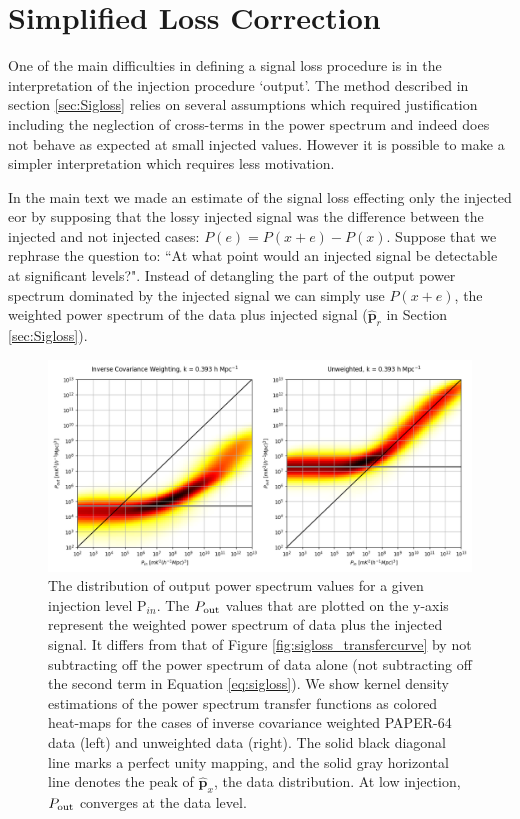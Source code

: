 \documentclass[preprint2,numberedappendix,tighten]{aastex6}  %
\begin{document}
\section{Simplified Loss Correction}
\label{sec:Pr_appendix}
One of the main difficulties in defining a signal loss procedure is in the interpretation of the injection procedure `output'. The method described in section \ref{sec:Sigloss} relies on several assumptions which required justification including the neglection of cross-terms in the power spectrum and indeed does not behave as expected at small injected values. However it is possible to make a simpler interpretation which requires less motivation.

In the main text we made an estimate of the signal loss effecting only the injected eor by supposing that the lossy injected signal was the difference between the injected and not injected cases: $ P(e) = P(x+e) - P(x)$. Suppose that we rephrase the question to: ``At what point would an injected signal be detectable at significant levels?". Instead of detangling the part of the output power spectrum dominated by the injected signal we can simply use $P(x+e)$, the weighted power spectrum of the data plus injected signal ($\hat{\textbf{p}}_{r}$ in Section \ref{sec:Sigloss}).
  
\begin{figure}[tp]
\centering
\includegraphics[width=\textwidth]{plots/method2_heatmap_I.png}
\caption{The distribution of output power spectrum values for a 
given injection level P$_{in}$. The $P_{\rm out}$ values that are plotted on the y-axis represent the weighted power spectrum of data plus the injected signal. It differs from that of Figure \ref{fig:sigloss_transfercurve} by not subtracting off the power spectrum of data alone (not subtracting off the second term in Equation \eqref{eq:sigloss}). We show kernel density estimations of the power spectrum transfer functions as colored heat-maps for the cases of inverse covariance weighted PAPER-64 data (left) and unweighted data (right). The solid black 
diagonal line marks a perfect unity mapping, and the solid gray horizontal line denotes the peak of $\hat{\textbf{p}}_{x}$, the data distribution. At low injection, $P_{\rm out}$ converges at the data level.}
\label{fig:Pr_vs_Pin}
\end{figure}  
  
\end{document}
